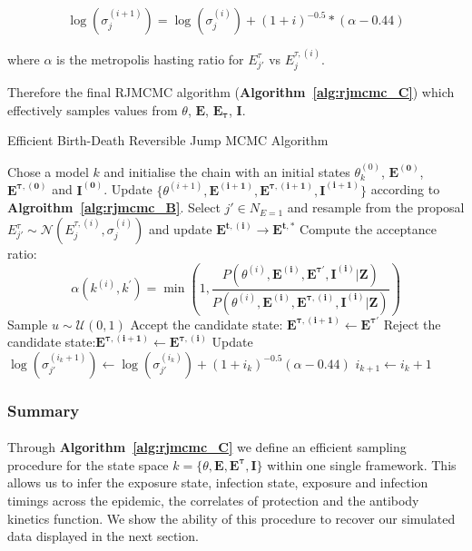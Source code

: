 $$\log\left(\sigma^{(i + 1)}_j\right) = \log\left(\sigma^{(i)}_j\right) +  (1 + i)^{-0.5}*(\alpha - 0.44) $$

where $\alpha$ is the metropolis hasting ratio for $E_{j'}^{\tau}$ vs $E_j^{\tau, (i)}$.

Therefore the final RJMCMC algorithm (\textbf{Algorithm~\ref{alg:rjmcmc_C}}) which effectively samples values from $\theta$, $\mathbf{E}$, $\mathbf{E_\tau}$, $\mathbf{I}$. 

\begin{algorithm}[H]
\caption{Efficient Birth-Death Reversible Jump MCMC Algorithm}
\label{alg:rjmcmc_C}
\begin{algorithmic}[1]
 \State Chose a model $k$ and initialise the chain with an initial states $\theta^{(0)}_{k}$, $\mathbf{E^{(0)}}$, $\mathbf{E^{\tau, (0)}}$ and $\mathbf{I^{(0)}}$.
    	\State Update $\{\theta^{(i + 1)}, \mathbf{E^{(i + 1)}}, \mathbf{E^{\tau, (i + 1)}}, \mathbf{I^{(i + 1)}}\}$ according to \textbf{Algroithm~\ref{alg:rjmcmc_B}}.
        \State Select $j' \in N_{E = 1}$ and resample from the proposal $E_{j'}^{\tau} \sim \mathcal{N}\left(E_{j}^{\tau, (i)}, \sigma^{(i)}_{j}\right)$ and update $\mathbf{E^{t, (i)}} \rightarrow \mathbf{E^{t, *}}$
            \State Compute the acceptance ratio:
        		\[
        		\alpha(k^{(i)}, k^{\prime}) = \min\left(1, \frac{P(\theta^{(i)}, \mathbf{E^{(i)}}, \mathbf{E^{\tau \prime}}, \mathbf{I^{(i)}}|\mathbf{Z})}{P(\theta^{(i)}, \mathbf{E^{(i)}}, \mathbf{E^{\tau, (i)}}, \mathbf{I^{(i)}}|\mathbf{Z})} \right)
        			\]
  \State Sample $u \sim \mathcal{U}(0, 1)$
            	\State Accept the candidate state: $\mathbf{E^{\tau, (i + 1)}}  \leftarrow \mathbf{E^{\tau\prime}} $
        \Else
            \State Reject the candidate state:$\mathbf{E^{\tau, (i + 1)}}  \leftarrow \mathbf{E^{\tau, (i)}} $
        \EndIf 
        \State Update $\log\left(\sigma_{j'}^{(i_k + 1)}\right) \leftarrow \log\left(\sigma_{j'}^{(i_k)}\right) + (1 +  i_k)^{-0.5}(\alpha - 0.44)$
        \State $i_{k + 1} \leftarrow i_k + 1$
            \EndFor
    \EndFor
\end{algorithmic}
\end{algorithm}


\subsubsection{Summary}
\paragraph{}Through \textbf{Algorithm~\ref{alg:rjmcmc_C}} we define an efficient sampling procedure for the state space $k = \{\theta, \mathbf{E}, \mathbf{E^\tau}, \mathbf{I}\}$ within one single framework. This allows us to infer the exposure state, infection state, exposure and infection timings across the epidemic, the correlates of protection and the antibody kinetics function. We show the ability of this procedure to recover our simulated data displayed in the next section.

